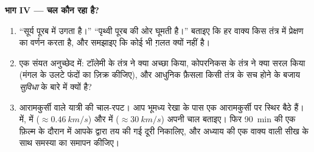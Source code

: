\begin{problem}
\medskip
\noindent\textbf{भाग IV --- चल कौन रहा है?}
\begin{enumerate}[resume]
  \item ``सूर्य पूरब में उगता है।'' ``पृथ्वी पूरब की ओर घूमती है।''
        बताइए कि हर वाक्य किस तंत्र में प्रेक्षण का वर्णन करता है, और
        समझाइए कि कोई भी ग़लत क्यों नहीं है।
  \item एक संयत अनुच्छेद में: टॉलेमी के तंत्र ने क्या अच्छा किया,
        कोपरनिकस के तंत्र ने क्या सरल किया (मंगल के उलटे फंदों का
        ज़िक्र कीजिए), और आधुनिक फ़ैसला किसी तंत्र के सच होने के बजाय
        \emph{सुविधा} के बारे में क्यों है?
  \item आरामकुर्सी वाले यात्री की चाल-रपट। आप भूमध्य रेखा के पास एक
        आरामकुर्सी पर स्थिर बैठे हैं।  में,
         में ($\approx \qty{0.46}{km/s}$) और
         में ($\approx \qty{30}{km/s}$) अपनी चाल बताइए। फिर
        \qty{90}{min} की एक फ़िल्म के दौरान  में
        आपके द्वारा तय की गई दूरी निकालिए, और अध्याय की एक वाक्य वाली
        सीख के साथ समस्या का समापन कीजिए।
\end{enumerate}
\end{problem}
